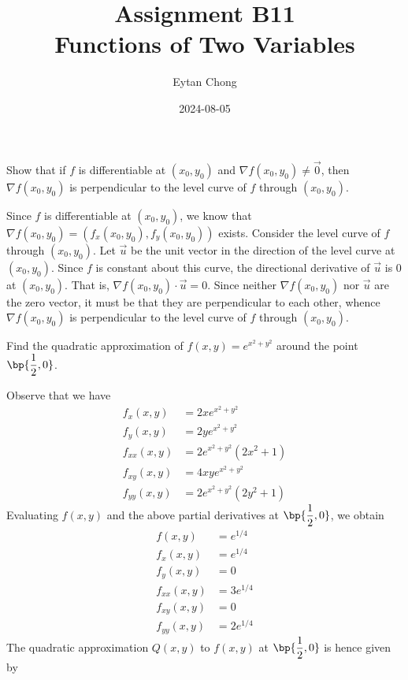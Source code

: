 \documentclass{echw}
\title{Assignment B11\\Functions of Two Variables}
\author{Eytan Chong}
\date{2024-08-05}
\begin{document}
    \problem{}
        Show that if $f$ is differentiable at $(x_0, y_0)$ and $\nabla f(x_0, y_0) \neq \vec 0$, then $\nabla f(x_0, y_0)$ is perpendicular to the level curve of $f$ through $(x_0, y_0)$.

    \solution
        Since $f$ is differentiable at $(x_0, y_0)$, we know that $\nabla f(x_0, y_0) = (f_x(x_0, y_0), f_y(x_0, y_0))$ exists. Consider the level curve of $f$ through $(x_0, y_0)$. Let $\vec u$ be the unit vector in the direction of the level curve at $(x_0, y_0)$. Since $f$ is constant about this curve, the directional derivative of $\vec u$ is 0 at $(x_0, y_0)$. That is, $\nabla f(x_0, y_0) \cdot \vec u = 0$. Since neither $\nabla f(x_0, y_0)$ nor $\vec u$ are the zero vector, it must be that they are perpendicular to each other, whence $\nabla f(x_0, y_0)$ is perpendicular to the level curve of $f$ through $(x_0, y_0)$.

    \problem{}
        Find the quadratic approximation of $f(x, y) = e^{x^2 + y^2}$ around the point $\bp{\dfrac12, 0}$.

    \solution
        Observe that we have
        \begin{align*}
            f_x(x, y) &= 2xe^{x^2 + y^2}\\
            f_y(x, y) &= 2ye^{x^2 + y^2}\\
            f_{xx}(x, y) &= 2e^{x^2 + y^2}(2x^2 + 1)\\
            f_{xy}(x, y) &= 4xye^{x^2 + y^2}\\
            f_{yy}(x, y) &= 2e^{x^2 + y^2}(2y^2 + 1)
        \end{align*}
        Evaluating $f(x, y)$ and the above partial derivatives at $\bp{\dfrac12, 0}$, we obtain
        \begin{align*}
            f(x, y) &= e^{1/4}\\
            f_x(x, y) &= e^{1/4}\\
            f_y(x, y) &= 0\\
            f_{xx}(x, y) &= 3e^{1/4}\\
            f_{xy}(x, y) &= 0\\
            f_{yy}(x, y) &= 2e^{1/4}
        \end{align*}
        The quadratic approximation $Q(x, y)$ to $f(x, y)$ at $\bp{\dfrac12, 0}$ is hence given by
\end{document}
